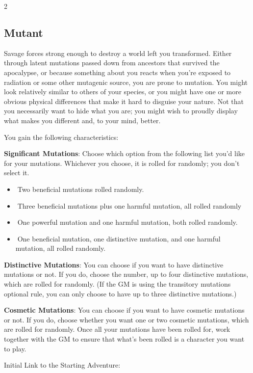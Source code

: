 \begin{multicols}{2}
\subsection{Mutant}

Savage forces strong enough to destroy a world left you transformed. Either through latent mutations passed down from ancestors that survived the apocalypse, or because something about you reacts when you’re exposed to radiation or some other mutagenic source, you are prone to mutation. You might look relatively similar to others of your species, or you might have one or more obvious physical differences that make it hard to disguise your nature. Not that you necessarily want to hide what you are; you might wish to proudly display what makes you different and, to your mind, better.

You gain the following characteristics:

\textbf{Significant Mutations}: Choose which option from the following list you’d like for your mutations. Whichever you choose, it is rolled for randomly; you don’t select it.

\begin{itemize}
\item  Two beneficial mutations rolled randomly.
\item  Three beneficial mutations plus one harmful mutation, all rolled randomly
\item  One powerful mutation and one harmful mutation, both rolled randomly.
\item  One beneficial mutation, one distinctive mutation, and one harmful mutation, all rolled randomly.
\end{itemize}

\textbf{Distinctive Mutations}: You can choose if you want to have distinctive mutations or not. If you do, choose the number, up to four distinctive mutations, which are rolled for randomly. (If the GM is using the transitory mutations optional rule, you can only choose to have up to three distinctive mutations.)

\textbf{Cosmetic Mutations}: You can choose if you want to have cosmetic mutations or not. If you do, choose whether you want one or two cosmetic mutations, which are rolled for randomly. Once all your mutations have been rolled for, work together with the GM to ensure that what’s been rolled is a character you want to play.

Initial Link to the Starting Adventure:


\end{multicols}

